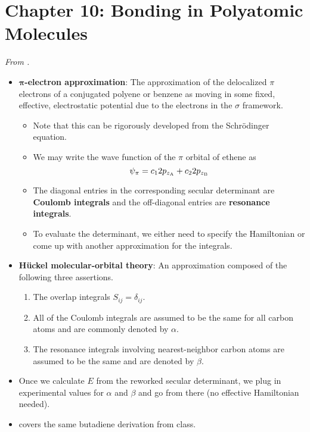 \documentclass[../notes.tex]{subfiles}
\begin{document}
\section{Chapter 10: Bonding in Polyatomic Molecules}
\emph{From \textcite{bib:McQuarrieSimon}.}
\begin{itemize}
    \item {}\textbf{$\bm{\pi}$-electron approximation}: The approximation of the delocalized $\pi$ electrons of a conjugated polyene or benzene as moving in some fixed, effective, electrostatic potential due to the electrons in the $\sigma$ framework.
    \begin{itemize}
        \item Note that this can be rigorously developed from the Schr\"{o}dinger equation.
        \item We may write the wave function of the $\pi$ orbital of ethene as
        \begin{equation*}
            \psi_\pi = c_12p_{z_{\ce{A}}}+c_22p_{z_{\ce{B}}}
        \end{equation*}
        \item The diagonal entries in the corresponding secular determinant are \textbf{Coulomb integrals} and the off-diagonal entries are \textbf{resonance integrals}.
        \item To evaluate the determinant, we either need to specify the Hamiltonian or come up with another approximation for the integrals.
    \end{itemize}
    \item \textbf{H\"{u}ckel molecular-orbital theory}: An approximation composed of the following three assertions.
    \begin{enumerate}
        \item The overlap integrals $S_{ij}=\delta_{ij}$.
        \item All of the Coulomb integrals are assumed to be the same for all carbon atoms and are commonly denoted by $\alpha$.
        \item The resonance integrals involving nearest-neighbor carbon atoms are assumed to be the same and are denoted by $\beta$.
    \end{enumerate}
    \item Once we calculate $E$ from the reworked secular determinant, we plug in experimental values for $\alpha$ and $\beta$ and go from there (no effective Hamiltonian needed).
    \item \textcite{bib:McQuarrieSimon} covers the same butadiene derivation from class.

\end{itemize}
\end{document}
